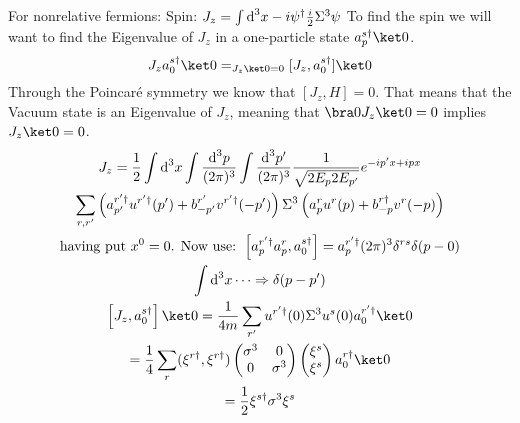 \documentclass[]{scrartcl}
\begin{document}
For nonrelative fermions: Spin: $J_z = \int \text d^3x -i\psi^\dagger\frac{i}{2}\Sigma^3\psi$
To find the spin we will want to find the Eigenvalue of $J_z$ in a one-particle state $a_p^{s\dagger}\ket0$. 
$$
J_z a_0^{s\dagger}\ket0 =_{J_z\ket0 = 0} [J_z, a_0^{s\dagger}]\ket0
$$
Through the Poincaré symmetry we know that $[J_z, H] = 0$. That means that the Vacuum state is an Eigenvalue of $J_z$, meaning that $\bra 0 J_z \ket 0 = 0$ implies $J_z\ket 0 = 0$.
\begin{gather}
	J_z = \frac{1}{2}\int\text d^3x\int\frac{\text d^3p}{(2\pi)^3}\int\frac{\text d^3p'}{(2\pi)^3} \frac{1}{\sqrt{2E_p 2E_{p'}}} e^{-ip'x + ipx} \\\sum_{r,r'}\left(a_{p'}^{r'\dagger}u^{r'\dagger}(p') + b_{-p'}^{r'}v^{r'\dagger}(-p')\right)\Sigma^3\left(a_p^r u^r(p) + b_{-p}^{r\dagger}v^r(-p)\right)\\ \text{having put $x^0 = 0$. Now use: } \left[a_p^{r'\dagger}a_p^r, a_0^{s\dagger}\right] = a_p^{r'\dagger}(2\pi)^3\delta^{rs}\delta(p-0)\nonumber\\
	\int\text d^3x \cdots \Rightarrow \delta(p-p')\\
	\left[J_z, a_0^{s\dagger}\right]\ket0 = \frac{1}{4m} \sum_{r'}u^{r'\dagger}(0) \Sigma^3 u^s(0)a_0^{r'\dagger}\ket0\\ = \frac{1}{4}\sum_r (\xi^{r\dagger}, \xi^{r\dagger})
	\begin{pmatrix}
		\sigma^3 & 0 \\ 0 & \sigma^3
	\end{pmatrix}
	\begin{pmatrix}
		\xi^s \\ \xi^s
	\end{pmatrix}
	a_0^{r\dagger}\ket0\\
	=\frac{1}{2}\xi^{s\dagger}\sigma^3\xi^s
\end{gather}
\end{document}
